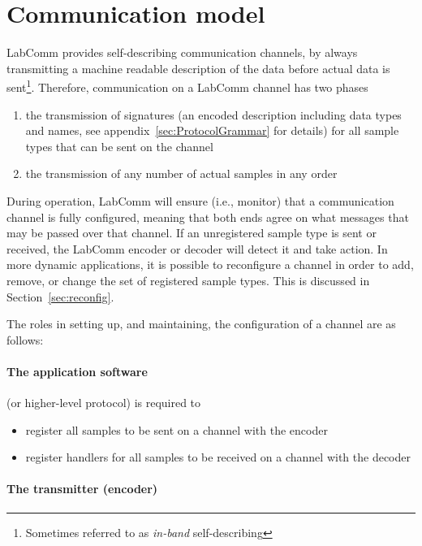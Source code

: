 \documentclass[a4paper]{article}
\begin{document}
\pagebreak
\section{Communication model}

LabComm provides self-describing communication channels, by always transmitting
a machine readable description of the data before actual data is
sent\footnote{Sometimes referred to as \emph{in-band} self-describing}.
Therefore, communication on a LabComm channel has two phases

\begin{enumerate}
\item the transmission of signatures (an encoded description including data
types and names, see appendix~\ref{sec:ProtocolGrammar} for details) for all sample types
that can be sent on the channel
\item the transmission of any number of actual samples in any order
\end{enumerate}

During operation, LabComm will ensure (i.e., monitor) that a communication
channel is fully configured, meaning that both ends agree on what messages that
may be passed over that channel.  If an unregistered sample type is sent or
received, the LabComm encoder or decoder will detect it and take action.
In more dynamic applications, it is possible to reconfigure a channel in order to add,
remove, or change the set of registered sample types. This is discussed
in Section~\ref{sec:reconfig}.

The roles in setting up, and maintaining, the configuration of a channel are as follows:

\paragraph{The application software} (or higher-level protocol) is required to

\begin{itemize}
\item register all samples to be sent on a channel with the encoder
\item register handlers for all samples to be received  on a channel with the decoder
\end{itemize}

\paragraph{The transmitter (encoder)}
\end{document}
